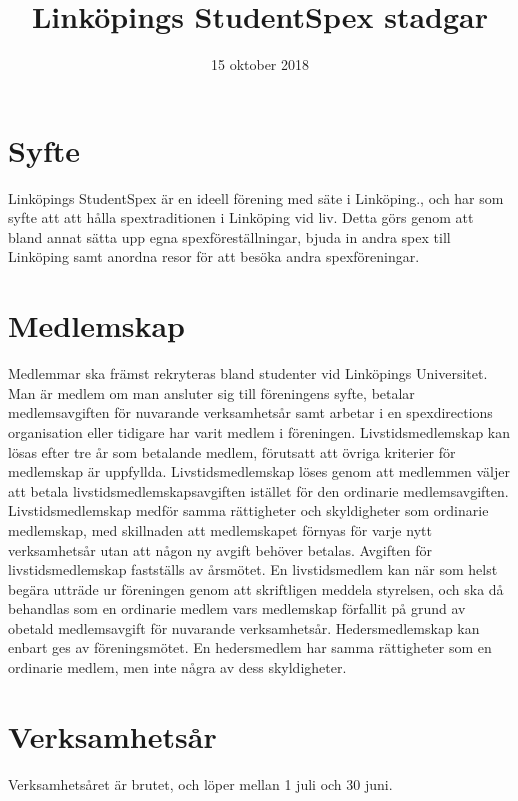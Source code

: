 \documentclass[a4paper]{article}
\title{Linköpings StudentSpex stadgar}
\author{}
\date{15 oktober 2018}
\begin{document}
\maketitle

\section{Syfte}
Linköpings StudentSpex är en ideell förening med säte i Linköping., och har som syfte att att hålla spextraditionen i Linköping vid liv. Detta görs genom att bland annat sätta upp egna spexföreställningar, bjuda in andra spex till Linköping samt anordna resor för att besöka andra spexföreningar.

\section{Medlemskap}
Medlemmar ska främst rekryteras bland studenter vid Linköpings Universitet. Man är medlem om man ansluter sig till föreningens syfte, betalar medlemsavgiften för nuvarande verksamhetsår samt arbetar i en spexdirections organisation eller tidigare har varit medlem i föreningen.\newline
\newline
Livstidsmedlemskap kan lösas efter tre år som betalande medlem, förutsatt att övriga kriterier för medlemskap är uppfyllda. Livstidsmedlemskap löses genom att medlemmen väljer att betala livstidsmedlemskapsavgiften istället för den ordinarie medlemsavgiften. Livstidsmedlemskap medför samma rättigheter och skyldigheter som ordinarie medlemskap, med skillnaden att medlemskapet förnyas för varje nytt verksamhetsår utan att någon ny avgift behöver betalas. Avgiften för livstidsmedlemskap fastställs av årsmötet. En livstidsmedlem kan när som helst begära utträde ur föreningen genom att skriftligen meddela styrelsen, och ska då behandlas som en ordinarie medlem vars medlemskap förfallit på grund av obetald medlemsavgift för nuvarande verksamhetsår.\newline
\newline
Hedersmedlemskap kan enbart ges av föreningsmötet. En hedersmedlem har samma rättigheter som en ordinarie medlem, men inte några av dess skyldigheter.

\section{Verksamhetsår}

Verksamhetsåret är brutet, och löper mellan 1 juli och 30 juni.
\end{document}
